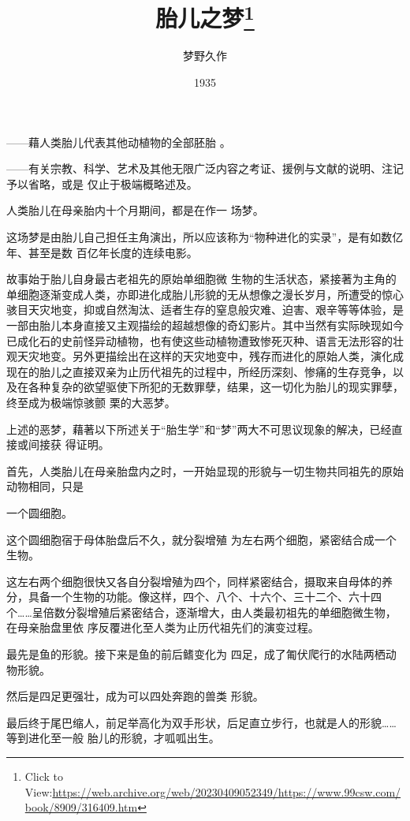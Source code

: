 \documentclass{article}
\title{胎儿之梦\footnote{Click to View:\url{https://web.archive.org/web/20230409052349/https://www.99csw.com/book/8909/316409.htm}}}
\author{梦野久作}
\date{1935}
\begin{document}

\maketitle


\Large

﻿——藉人类胎儿代表其他动植物的全部胚胎
。 

——有关宗教、科学、艺术及其他无限广泛内容之考证、援例与文献的说明、注记予以省略，或是
仅止于极端概略述及。 

人类胎儿在母亲胎内十个月期间，都是在作一
场梦。 

这场梦是由胎儿自己担任主角演出，所以应该称为“物种进化的实录”，是有如数亿年、甚至是数
百亿年长度的连续电影。 

故事始于胎儿自身最古老祖先的原始单细胞微
\newpage
生物的生活状态，紧接著为主角的单细胞逐渐变成人类，亦即进化成胎儿形貌的无从想像之漫长岁月，所遭受的惊心骇目天灾地变，抑或自然淘汰、适者生存的窒息般灾难、迫害、艰辛等等体验，是一部由胎儿本身直接又主观描绘的超越想像的奇幻影片。其中当然有实际映现如今已成化石的史前怪异动植物，也有使这些动植物遭致惨死灭种、语言无法形容的壮观天灾地变。另外更描绘出在这样的天灾地变中，残存而进化的原始人类，演化成现在的胎儿之直接双亲为止历代祖先的过程中，所经历深刻、惨痛的生存竞争，以及在各种复杂的欲望驱使下所犯的无数罪孽，结果，这一切化为胎儿的现实罪孽，终至成为极端惊骇颤
栗的大恶梦。 

上述的恶梦，藉著以下所述关于“胎生学”和“梦”两大不可思议现象的解决，已经直接或间接获
得证明。 

首先，人类胎儿在母亲胎盘内之时，一开始显现的形貌与一切生物共同祖先的原始动物相同，只是

\newpage
一个圆细胞。 

这个圆细胞宿于母体胎盘后不久，就分裂增殖
为左右两个细胞，紧密结合成一个生物。 

这左右两个细胞很快又各自分裂增殖为四个，同样紧密结合，摄取来自母体的养分，具备一个生物的功能。像这样，四个、八个、十六个、三十二个、六十四个……呈倍数分裂增殖后紧密结合，逐渐增大，由人类最初祖先的单细胞微生物，在母亲胎盘里依
序反覆进化至人类为止历代祖先们的演变过程。 

最先是鱼的形貌。接下来是鱼的前后鳍变化为
四足，成了匍伏爬行的水陆两栖动物形貌。 

然后是四足更强壮，成为可以四处奔跑的兽类
形貌。 

最后终于尾巴缩人，前足举高化为双手形状，后足直立步行，也就是人的形貌……等到进化至一般
胎儿的形貌，才呱呱出生。 

\newpage
\end{document}
